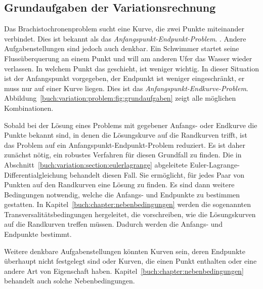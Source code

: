 %
%
\subsection{Grundaufgaben der Variationsrechnung}

Das Brachistochronenproblem sucht eine Kurve, die zwei Punkte miteinander
verbindet.
Dies ist bekannt als das {\em Anfangspunkt-Endpunkt-Problem}.
.
Andere Aufgabenstellungen sind jedoch auch denkbar.
Ein Schwimmer startet seine Flussüberquerung an einem Punkt
und will am anderen Ufer das Wasser wieder verlassen.
In welchem Punkt das geschieht, ist weniger wichtig.
In dieser Situation ist der Anfangspunkt vorgegeben, der Endpunkt ist
weniger eingeschränkt, er muss nur auf einer Kurve liegen.
Dies ist das {\em Anfangspunkt-Endkurve-Problem}.
Abbildung~\ref{buch:variation:problem:fig:grundaufgaben}
zeigt alle möglichen Kombinationen.

Sobald bei der Lösung eines Problems mit gegebener Anfangs- oder Endkurve
die Punkte bekannt sind, in denen die Lösungskurve auf die Randkurven
trifft, ist das Problem auf ein Anfangspunkt-Endpunkt-Problem reduziert.
Es ist daher zunächst nötig, ein robustes Verfahren für diesen Grundfall
zu finden.
Die in Abschnitt~\ref{buch:variation:section:eulerlagrange}
abgeleitete Euler-Lagrange-Differentialgleichung behandelt diesen
Fall.
Sie ermöglicht, für jedes Paar von Punkten auf den Randkurven
eine Lösung zu finden.
Es sind dann weitere Bedingungen notwendig, welche die Anfangs- und
Endpunkte zu bestimmen gestatten.
In Kapitel~\ref{buch:chapter:nebenbedingungen} werden die sogenannten
Transversalitätsbedingungen hergeleitet, die vorschreiben, wie die
Lösungskurven auf die Randkurven treffen müssen.
Dadurch werden die Anfangs- und Endpunkte bestimmt.

Weitere denkbare Aufgabenstellungen könnten Kurven sein, deren Endpunkte
überhaupt nicht festgelegt sind oder Kurven, die einen Punkt enthalten
oder eine andere Art von Eigenschaft haben.
Kapitel~\ref{buch:chapter:nebenbedingungen} behandelt auch solche
Nebenbedingungen.


